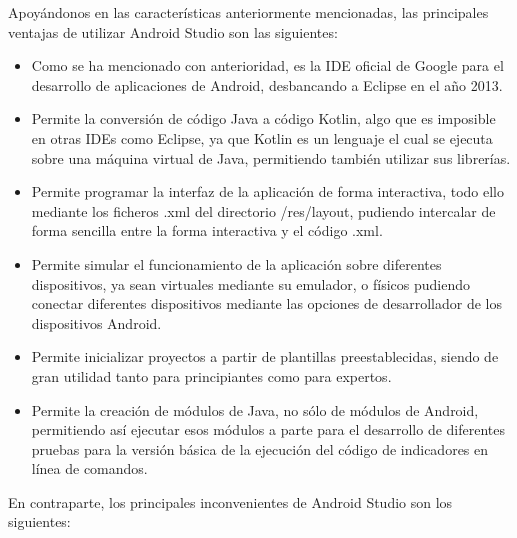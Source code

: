 Apoyándonos en las características anteriormente mencionadas, las principales
ventajas de utilizar Android Studio son las siguientes:
\begin{itemize}
    \item Como se ha mencionado con anterioridad, es la IDE oficial de Google
    para el desarrollo de aplicaciones de Android, desbancando a Eclipse en el
    año 2013.
    \item Permite la conversión de código Java a código Kotlin, algo que es
    imposible en otras IDEs como Eclipse, ya que Kotlin es un lenguaje el cual
    se ejecuta sobre una máquina virtual de Java, permitiendo también utilizar
    sus librerías.
    \item Permite programar la interfaz de la aplicación de forma interactiva,
    todo ello mediante los ficheros .xml del directorio /res/layout, pudiendo
    intercalar de forma sencilla entre la forma interactiva y el código .xml.
    \item Permite simular el funcionamiento de la aplicación sobre diferentes
    dispositivos, ya sean virtuales mediante su emulador, o físicos pudiendo
    conectar diferentes dispositivos mediante las opciones de desarrollador de
    los dispositivos Android.
    \item Permite inicializar proyectos a partir de plantillas preestablecidas,
    siendo de gran utilidad tanto para principiantes como para expertos.
    \item Permite la creación de módulos de Java, no sólo de módulos de Android,
    permitiendo así ejecutar esos módulos a parte para el desarrollo de
    diferentes pruebas para la versión básica de la ejecución del código de
    indicadores en línea de comandos.
\end{itemize} 
En contraparte, los principales inconvenientes de Android Studio son los siguientes:
